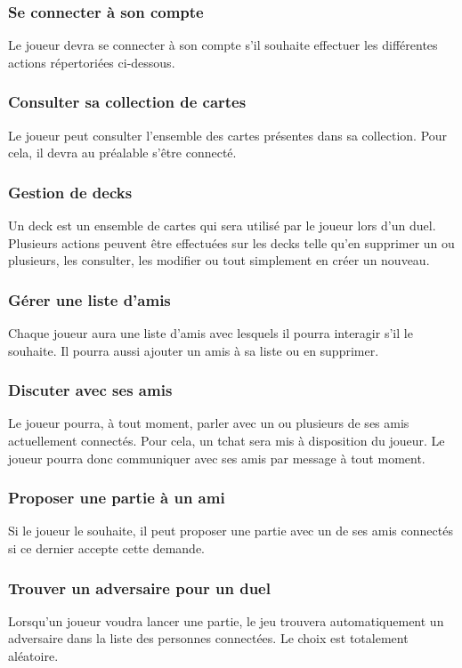 \documentclass[11pt,a4paper]{article}
\begin{document}
  \subsubsection{Se connecter à son compte}
    Le joueur devra se connecter à son compte s'il souhaite effectuer les différentes actions répertoriées ci-dessous.

  \subsubsection{Consulter sa collection de cartes}
    Le joueur peut consulter l'ensemble des cartes présentes dans sa collection. Pour cela, il devra au préalable s'être connecté.

  \subsubsection{Gestion de decks}
    Un deck est un ensemble de cartes qui sera utilisé par le joueur lors d'un duel. Plusieurs actions peuvent être effectuées sur les decks telle qu'en supprimer un ou plusieurs, les consulter, les modifier ou tout simplement en créer un nouveau.

  \subsubsection{Gérer une liste d'amis}
    Chaque joueur aura une liste d'amis avec lesquels il pourra interagir s'il le souhaite. Il pourra aussi ajouter un amis à sa liste ou en supprimer.

  \subsubsection{Discuter avec ses amis}
    Le joueur pourra, à tout moment, parler avec un ou plusieurs de ses amis actuellement connectés. Pour cela, un tchat sera mis à disposition du joueur.  Le joueur pourra donc communiquer avec ses amis par message à tout moment.

  \subsubsection{Proposer une partie à un ami}
    Si le joueur le souhaite, il peut proposer une partie avec un de ses amis connectés si ce dernier accepte cette demande.

  \subsubsection{Trouver un adversaire pour un duel}
    Lorsqu'un joueur voudra lancer une partie, le jeu trouvera automatiquement un adversaire dans la liste des personnes connectées.  Le choix est totalement aléatoire.
\end{document}
